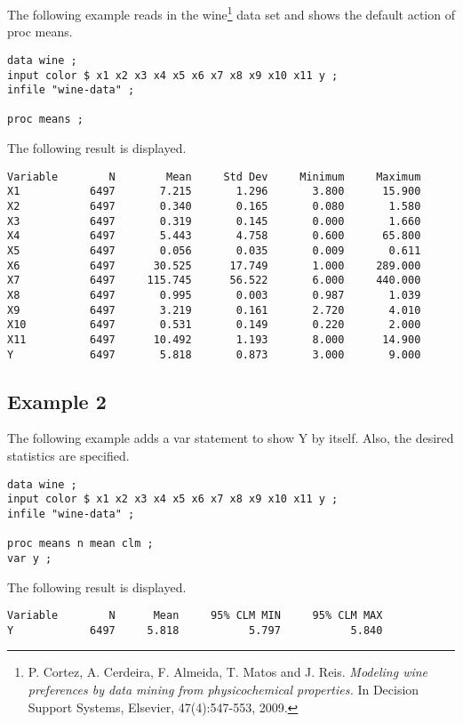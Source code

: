 \documentclass[12pt]{article}
\begin{document}
The following example reads in the wine\footnote{
P. Cortez, A. Cerdeira, F. Almeida, T. Matos and J. Reis.
{\it Modeling wine preferences by data mining from physicochemical properties.}
In Decision Support Systems, Elsevier, 47(4):547-553, 2009.}
data set and shows the default action of proc means.

{\scriptsize\begin{verbatim}
data wine ;
input color $ x1 x2 x3 x4 x5 x6 x7 x8 x9 x10 x11 y ;
infile "wine-data" ;

proc means ;
\end{verbatim}}

The following result is displayed.

{\scriptsize\begin{verbatim}
Variable        N        Mean     Std Dev     Minimum     Maximum
X1           6497       7.215       1.296       3.800      15.900
X2           6497       0.340       0.165       0.080       1.580
X3           6497       0.319       0.145       0.000       1.660
X4           6497       5.443       4.758       0.600      65.800
X5           6497       0.056       0.035       0.009       0.611
X6           6497      30.525      17.749       1.000     289.000
X7           6497     115.745      56.522       6.000     440.000
X8           6497       0.995       0.003       0.987       1.039
X9           6497       3.219       0.161       2.720       4.010
X10          6497       0.531       0.149       0.220       2.000
X11          6497      10.492       1.193       8.000      14.900
Y            6497       5.818       0.873       3.000       9.000
\end{verbatim}}

\subsection*{Example 2}

The following example adds a var statement to show Y by itself.
Also, the desired statistics are specified.

{\scriptsize\begin{verbatim}
data wine ;
input color $ x1 x2 x3 x4 x5 x6 x7 x8 x9 x10 x11 y ;
infile "wine-data" ;

proc means n mean clm ;
var y ;
\end{verbatim}}

The following result is displayed.

{\scriptsize\begin{verbatim}
Variable        N      Mean     95% CLM MIN     95% CLM MAX
Y            6497     5.818           5.797           5.840
\end{verbatim}}
\end{document}
